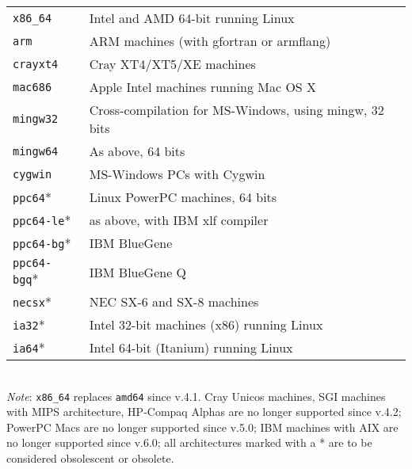 \documentclass[12pt,a4paper]{article}
\begin{document}
\begin{tabular}{ll}
\texttt{x86\_64}   & Intel and AMD 64-bit running Linux\\
\texttt{arm}       & ARM machines (with gfortran or armflang)\\
\texttt{crayxt4}   & Cray XT4/XT5/XE machines\\
\texttt{mac686}    & Apple Intel machines running Mac OS X\\
\texttt{mingw32}   & Cross-compilation for MS-Windows, using mingw, 32 bits\\
\texttt{mingw64}   & As above, 64 bits\\
\texttt{cygwin}    & MS-Windows PCs with Cygwin\\
\texttt{ppc64}*    & Linux PowerPC machines, 64 bits\\
\texttt{ppc64-le}* & as above, with IBM xlf compiler\\
\texttt{ppc64-bg}* & IBM BlueGene\\
\texttt{ppc64-bgq}*& IBM BlueGene Q\\
\texttt{necsx}*    & NEC SX-6 and SX-8 machines\\
\texttt{ia32}*     & Intel 32-bit machines (x86) running Linux\\
\texttt{ia64}*     & Intel 64-bit (Itanium) running Linux
\end{tabular}\\

{\em Note}: \texttt{x86\_64} replaces \texttt{amd64} since v.4.1.
Cray Unicos machines, SGI machines with MIPS architecture, HP-Compaq Alphas
are no longer supported since v.4.2; PowerPC Macs are no longer
supported since v.5.0; IBM machines with AIX are no longer supported
since v.6.0; all architectures marked with a * are to be considered
obsolescent or obsolete.
\end{document}
